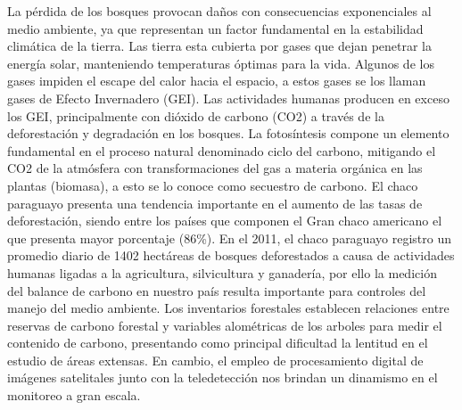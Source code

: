 La p\'erdida de los bosques provocan da\~{n}os con consecuencias exponenciales al medio ambiente, ya que representan un factor fundamental en la estabilidad clim\'atica de la tierra. Las tierra esta cubierta por gases que dejan penetrar la energ\'ia solar, manteniendo temperaturas \'optimas para la vida. Algunos de los gases impiden el escape del calor hacia el espacio, a estos gases se los llaman gases de Efecto Invernadero (GEI). Las actividades humanas producen en exceso los GEI, principalmente con di\'oxido de carbono (CO2) a trav\'es de la deforestaci\'on y degradaci\'on en los bosques. La fotos\'intesis compone un elemento fundamental en el proceso natural denominado ciclo del carbono, mitigando el CO2 de la atm\'osfera con transformaciones del gas a materia org\'anica en las plantas (biomasa), a esto se lo conoce como secuestro de carbono. El chaco paraguayo presenta una tendencia importante en el aumento de las tasas de deforestaci\'on, siendo entre los pa\'ises que componen el Gran chaco americano el que presenta mayor porcentaje (86\%). 
En el 2011, el chaco paraguayo registro un promedio diario de 1402 hect\'areas de bosques deforestados a causa de actividades humanas ligadas a la agricultura, silvicultura y ganader\'ia, por ello la medici\'on del balance de carbono en nuestro pa\'is resulta importante para controles del manejo del medio ambiente. Los inventarios forestales establecen relaciones entre reservas de carbono forestal y variables alom\'etricas de los arboles  para medir el contenido de carbono, presentando como principal dificultad la lentitud en el estudio de \'areas extensas. En cambio, el empleo de procesamiento digital de im\'agenes satelitales junto con la teledetecci\'on nos brindan un dinamismo en el monitoreo a gran escala.